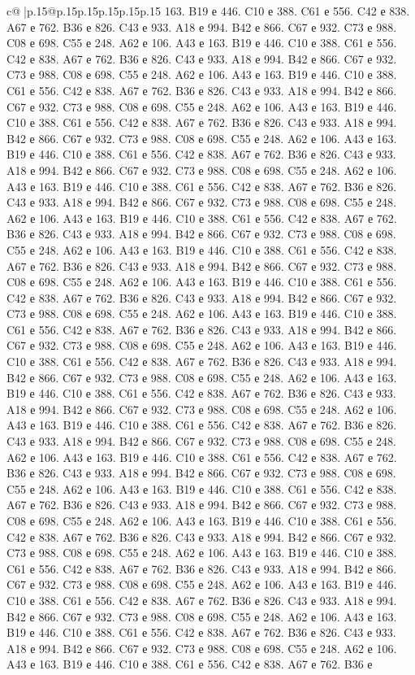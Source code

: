 \documentclass{article}
\begin{document}
{\begin{supertabular}{c@{$\;$}|p{.15\linewidth}@{}p{.15\linewidth}p{.15\linewidth}p{.15\linewidth}p{.15\linewidth}p{.15\linewidth}}
{{{163. B19 е 446. C10 е 388. C61 е 556. C42 е 838. A67 е 762. B36 е 826. C43 е 933. A18 е 994. B42 е 866. C67 е 932. C73 е 988. C08 е 698. C55 е 248. A62 е 106. A43 е 163. B19 е 446. C10 е 388. C61 е 556. C42 е 838. A67 е 762. B36 е 826. C43 е 933. A18 е 994. B42 е 866. C67 е 932. C73 е 988. C08 е 698. C55 е 248. A62 е 106. A43 е 163. B19 е 446. C10 е 388. C61 е 556. C42 е 838. A67 е 762. B36 е 826. C43 е 933. A18 е 994. B42 е 866. C67 е 932. C73 е 988. C08 е 698. C55 е 248. A62 е 106. A43 е 163. B19 е 446. C10 е 388. C61 е 556. C42 е 838. A67 е 762. B36 е 826. C43 е 933. A18 е 994. B42 е 866. C67 е 932. C73 е 988. C08 е 698. C55 е 248. A62 е 106. A43 е 163. B19 е 446. C10 е 388. C61 е 556. C42 е 838. A67 е 762. B36 е 826. C43 е 933. A18 е 994. B42 е 866. C67 е 932. C73 е 988. C08 е 698. C55 е 248. A62 е 106. A43 е 163. B19 е 446. C10 е 388. C61 е 556. C42 е 838. A67 е 762. B36 е 826. C43 е 933. A18 е 994. B42 е 866. C67 е 932. C73 е 988. C08 е 698. C55 е 248. A62 е 106. A43 е 163. B19 е 446. C10 е 388. C61 е 556. C42 е 838. A67 е 762. B36 е 826. C43 е 933. A18 е 994. B42 е 866. C67 е 932. C73 е 988. C08 е 698. C55 е 248. A62 е 106. A43 е 163. B19 е 446. C10 е 388. C61 е 556. C42 е 838. A67 е 762. B36 е 826. C43 е 933. A18 е 994. B42 е 866. C67 е 932. C73 е 988. C08 е 698. C55 е 248. A62 е 106. A43 е 163. B19 е 446. C10 е 388. C61 е 556. C42 е 838. A67 е 762. B36 е 826. C43 е 933. A18 е 994. B42 е 866. C67 е 932. C73 е 988. C08 е 698. C55 е 248. A62 е 106. A43 е 163. B19 е 446. C10 е 388. C61 е 556. C42 е 838. A67 е 762. B36 е 826. C43 е 933. A18 е 994. B42 е 866. C67 е 932. C73 е 988. C08 е 698. C55 е 248. A62 е 106. A43 е 163. B19 е 446. C10 е 388. C61 е 556. C42 е 838. A67 е 762. B36 е 826. C43 е 933. A18 е 994. B42 е 866. C67 е 932. C73 е 988. C08 е 698. C55 е 248. A62 е 106. A43 е 163. B19 е 446. C10 е 388. C61 е 556. C42 е 838. A67 е 762. B36 е 826. C43 е 933. A18 е 994. B42 е 866. C67 е 932. C73 е 988. C08 е 698. C55 е 248. A62 е 106. A43 е 163. B19 е 446. C10 е 388. C61 е 556. C42 е 838. A67 е 762. B36 е 826. C43 е 933. A18 е 994. B42 е 866. C67 е 932. C73 е 988. C08 е 698. C55 е 248. A62 е 106. A43 е 163. B19 е 446. C10 е 388. C61 е 556. C42 е 838. A67 е 762. B36 е 826. C43 е 933. A18 е 994. B42 е 866. C67 е 932. C73 е 988. C08 е 698. C55 е 248. A62 е 106. A43 е 163. B19 е 446. C10 е 388. C61 е 556. C42 е 838. A67 е 762. B36 е 826. C43 е 933. A18 е 994. B42 е 866. C67 е 932. C73 е 988. C08 е 698. C55 е 248. A62 е 106. A43 е 163. B19 е 446. C10 е 388. C61 е 556. C42 е 838. A67 е 762. B36 е 826. C43 е 933. A18 е 994. B42 е 866. C67 е 932. C73 е 988. C08 е 698. C55 е 248. A62 е 106. A43 е 163. B19 е 446. C10 е 388. C61 е 556. C42 е 838. A67 е 762. B36 е 826. C43 е 933. A18 е 994. B42 е 866. C67 е 932. C73 е 988. C08 е 698. C55 е 248. A62 е 106. A43 е 163. B19 е 446. C10 е 388. C61 е 556. C42 е 838. A67 е 762. B36 е 826. C43 е 933. A18 е 994. B42 е 866. C67 е 932. C73 е 988. C08 е 698. C55 е 248. A62 е 106. A43 е 163. B19 е 446. C10 е 388. C61 е 556. C42 е 838. A67 е 762. B36 е 826. C43 е 933. A18 е 994. B42 е 866. C67 е 932. C73 е 988. C08 е 698. C55 е 248. A62 е 106. A43 е 163. B19 е 446. C10 е 388. C61 е 556. C42 е 838. A67 е 762. B36 е }}}
\end{supertabular}}
\end{document}

